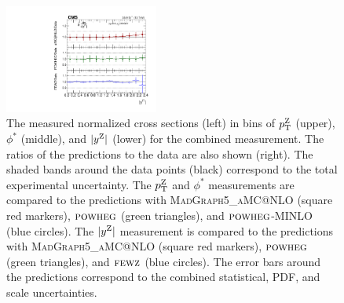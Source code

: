 \begin{figure}
        \includegraphics[width=0.45\textwidth]{figures/zpt/zll_rap_ratio_norm.pdf}    
	\caption{The measured normalized cross sections (left) in bins of $p_{\mathrm{T}}^{\mathrm{Z}}$ (upper), $\phi^*$ (middle), and $|y^{\mathrm{Z}}|$ (lower) for the combined measurement. The ratios of the predictions to the data are also shown (right). The shaded bands around the data points (black) correspond to the total experimental uncertainty. The $p_{\mathrm{T}}^{\mathrm{Z}}$  and $\phi^*$ measurements are compared to the predictions with \textsc{MadGraph5\_aMC@NLO} (square red markers), ${\textsc{powheg}}$ (green triangles), and ${\textsc{powheg}}$-\textsc{MINLO} (blue circles). The $|y^{\mathrm{Z}}|$ measurement is compared to the predictions with \textsc{MadGraph5\_aMC@NLO} (square red markers), ${\textsc{powheg}}$ (green triangles), and ${\textsc{fewz}}$ (blue circles). The error bars around the predictions correspond to the combined statistical, PDF, and scale uncertainties.}
	\label{fig:cross_norm}
\end{figure}


